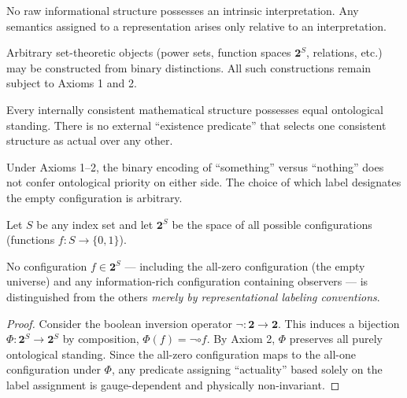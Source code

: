 \documentclass[11pt]{article}
\begin{document}
\begin{axiom}
No raw informational structure possesses an intrinsic interpretation.
Any semantics assigned to a representation arises only relative
to an interpretation.
\end{axiom}

\begin{axiom}
Arbitrary set-theoretic objects (power sets, function spaces $\mathbf{2}^S$, relations, etc.) may be constructed from binary distinctions. All such constructions remain subject to Axioms 1 and 2.
\end{axiom}

\begin{axiom}[Plenitude]
Every internally consistent mathematical structure possesses equal ontological standing. There is no external ``existence predicate'' that selects one consistent structure as actual over any other.
\end{axiom}

\begin{theorem}
Under Axioms 1--2, the binary encoding of ``something'' versus ``nothing'' does not confer ontological priority on either side. The choice of which label designates the empty configuration is arbitrary.
\end{theorem}

\begin{theorem}
Let $S$ be any index set and let $\mathbf{2}^S$ be the space of all possible configurations (functions $f: S \to \{0,1\}$).  

No configuration $f \in \mathbf{2}^S$ --- including the all-zero configuration (the empty universe) and any information-rich configuration containing observers --- is distinguished from the others \emph{merely by representational labeling conventions}. 
\end{theorem}

\begin{proof}
Consider the boolean inversion operator $\neg: \mathbf{2} \to \mathbf{2}$. This induces a bijection $\Phi: \mathbf{2}^S \to \mathbf{2}^S$ by composition, $\Phi(f) = \neg \circ f$. By Axiom 2, $\Phi$ preserves all purely ontological standing. Since the all-zero configuration maps to the all-one configuration under $\Phi$, any predicate assigning ``actuality'' based solely on the label assignment is gauge-dependent and physically non-invariant.
\end{proof}
\end{document}
